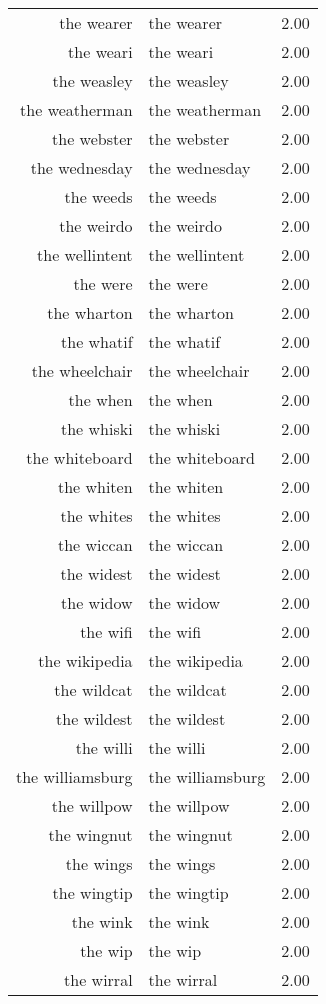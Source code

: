 \begin{table}[ht]
\begin{tabular}{rlr}
  the wearer & the wearer & 2.00 \\ 
  the weari & the weari & 2.00 \\ 
  the weasley & the weasley & 2.00 \\ 
  the weatherman & the weatherman & 2.00 \\ 
  the webster & the webster & 2.00 \\ 
  the wednesday & the wednesday & 2.00 \\ 
  the weeds & the weeds & 2.00 \\ 
  the weirdo & the weirdo & 2.00 \\ 
  the wellintent & the wellintent & 2.00 \\ 
  the were & the were & 2.00 \\ 
  the wharton & the wharton & 2.00 \\ 
  the whatif & the whatif & 2.00 \\ 
  the wheelchair & the wheelchair & 2.00 \\ 
  the when & the when & 2.00 \\ 
  the whiski & the whiski & 2.00 \\ 
  the whiteboard & the whiteboard & 2.00 \\ 
  the whiten & the whiten & 2.00 \\ 
  the whites & the whites & 2.00 \\ 
  the wiccan & the wiccan & 2.00 \\ 
  the widest & the widest & 2.00 \\ 
  the widow & the widow & 2.00 \\ 
  the wifi & the wifi & 2.00 \\ 
  the wikipedia & the wikipedia & 2.00 \\ 
  the wildcat & the wildcat & 2.00 \\ 
  the wildest & the wildest & 2.00 \\ 
  the willi & the willi & 2.00 \\ 
  the williamsburg & the williamsburg & 2.00 \\ 
  the willpow & the willpow & 2.00 \\ 
  the wingnut & the wingnut & 2.00 \\ 
  the wings & the wings & 2.00 \\ 
  the wingtip & the wingtip & 2.00 \\ 
  the wink & the wink & 2.00 \\ 
  the wip & the wip & 2.00 \\ 
  the wirral & the wirral & 2.00 \\ 

\end{tabular}
\end{table}
